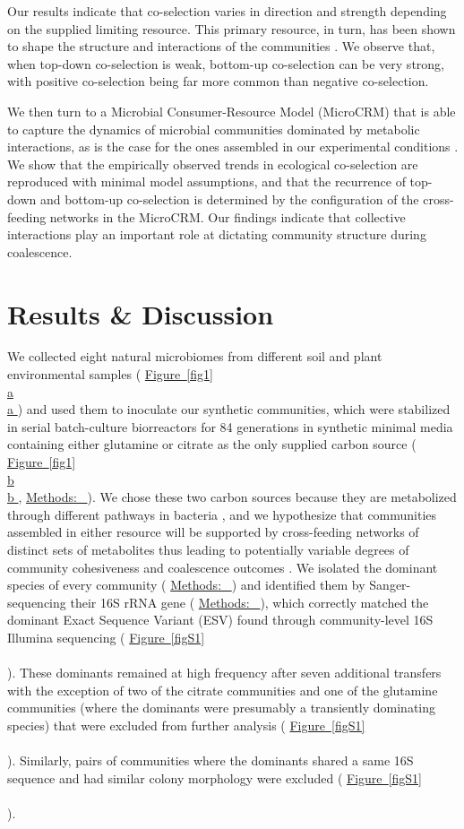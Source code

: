 \documentclass[a4paper,10pt]{article}
\newcommand{\figref}[2][]{%
  \hyperref[{#2}]{%
    Figure~\ref*{#2}%
    \ifx\\#1\\%
    \else
      #1%
    \fi
  }%
}
\newcommand{\methodsref}[1]{%
  \hyperref[{methods:#1}]{%
   Methods:~\nameref*{methods:#1}%
  }%
}
\begin{document}
Our results indicate that co-selection varies in direction and strength depending on the supplied limiting
resource.
This primary resource, in turn, has been shown to
shape the structure and interactions of the communities \cite{Estrela2020}.
We observe that, when top-down co-selection is weak, bottom-up co-selection can be very strong,
with positive co-selection being far more common than negative co-selection.

We then turn to a Microbial Consumer-Resource Model (MicroCRM)
\cite{Goldford2018,Marsland2019,Marsland2020}
that is able to capture the dynamics of microbial communities dominated by metabolic interactions,
as is the case for the ones assembled in our experimental conditions \cite{Goldford2018,Estrela2020}.
We show that the empirically observed trends in ecological co-selection are reproduced
with minimal model assumptions, and that the recurrence of top-down and bottom-up co-selection
is determined by the configuration of the cross-feeding networks in the MicroCRM.
Our findings indicate that collective interactions play an important role at dictating community structure
during coalescence.

\section*{Results \& Discussion}\label{results-discussion}

We collected eight natural microbiomes from different soil and plant environmental samples
(\figref[a]{fig1})
and used them to inoculate our synthetic communities, which were stabilized 
in serial batch-culture biorreactors for 84 generations in synthetic minimal media containing either
glutamine or citrate as the only supplied carbon source
(\figref[b]{fig1}, \methodsref{community-assembly}).
We chose these two carbon sources because they are metabolized through different
pathways in bacteria \cite{Dimroth2004,Forchhammer2007},
and we hypothesize that communities assembled in either resource will be supported by
cross-feeding networks of distinct sets of metabolites \cite{Goldford2018,Estrela2020}
thus leading to potentially variable degrees of community cohesiveness
and coalescence outcomes \cite{Tikhonov2016,Tikhonov2017,Castledine2020,Lechon2021}.
We isolated the dominant species of every community
(\methodsref{dominants})
and identified them by Sanger-sequencing their 16S rRNA gene
(\methodsref{sequencing}), which correctly matched the dominant
Exact Sequence Variant (ESV) \cite{Callahan2016,Callahan2017} found through
community-level 16S Illumina sequencing
(\figref{figS1}).
These dominants remained at high frequency after seven additional transfers
with the exception of two of the citrate communities and one of the glutamine
communities (where the dominants were presumably a transiently dominating species)
that were excluded from further analysis
(\figref{figS1}).
Similarly, pairs of communities where the dominants shared a same 16S sequence
and had similar colony morphology were excluded
(\figref{figS1}).
\end{document}
